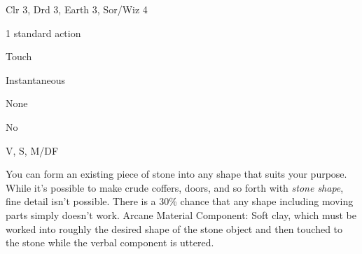 
\begin{description*}
\item[Level:] Clr 3, Drd 3, Earth 3, Sor/Wiz 4
\item[Casting Time:] 1 standard action
\item[Range:] Touch
\item[Duration:] Instantaneous
\item[Saving Throw:] None
\item[Spell Resistance:] No
\item[Components:] V, S, M/DF
\end{description*}

You can form an existing piece of stone into any shape that suits your purpose.
While it's possible to make crude coffers, doors, and so forth with \textit{stone
shape}, fine detail isn't possible. There is a 30\% chance that any shape including
moving parts simply doesn't work.
Arcane Material Component: Soft clay, which must be worked into roughly
the desired shape of the stone object and then touched to the stone while the verbal
component is uttered.